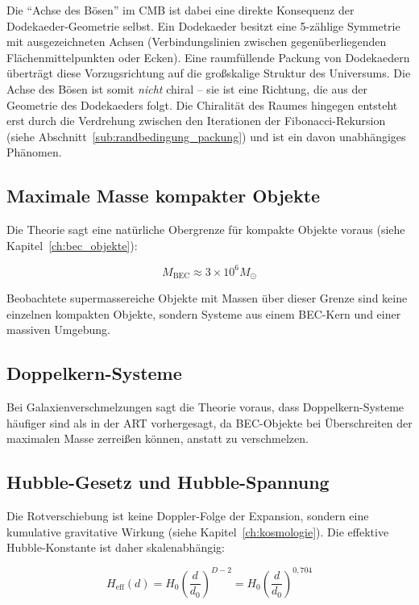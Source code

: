 Die \enquote{Achse des Bösen} im CMB ist dabei eine direkte Konsequenz der Dodekaeder-Geometrie selbst. Ein Dodekaeder besitzt eine 5-zählige Symmetrie mit ausgezeichneten Achsen (Verbindungslinien zwischen gegenüberliegenden Flächenmittelpunkten oder Ecken). Eine raumfüllende Packung von Dodekaedern überträgt diese Vorzugsrichtung auf die großskalige Struktur des Universums. Die Achse des Bösen ist somit \emph{nicht} chiral – sie ist eine Richtung, die aus der Geometrie des Dodekaeders folgt. Die Chiralität des Raumes hingegen entsteht erst durch die Verdrehung zwischen den Iterationen der Fibonacci-Rekursion (siehe Abschnitt~\ref{sub:randbedingung_packung}) und ist ein davon unabhängiges Phänomen.

\subsection{Maximale Masse kompakter Objekte}
\label{sub:vorh_max_masse}

Die Theorie sagt eine natürliche Obergrenze für kompakte Objekte voraus (siehe Kapitel~\ref{ch:bec_objekte}):

\[
M_{\text{BEC}} \approx 3 \times 10^6 M_{\odot}
\]

Beobachtete supermassereiche Objekte mit Massen über dieser Grenze sind keine einzelnen kompakten Objekte, sondern Systeme aus einem BEC-Kern und einer massiven Umgebung.

\subsection{Doppelkern-Systeme}
\label{sub:vorh_doppelkern}

Bei Galaxienverschmelzungen sagt die Theorie voraus, dass Doppelkern-Systeme häufiger sind als in der ART vorhergesagt, da BEC-Objekte bei Überschreiten der maximalen Masse zerreißen können, anstatt zu verschmelzen.

\subsection{Hubble-Gesetz und Hubble-Spannung}
\label{sub:vorh_hubble}

Die Rotverschiebung ist keine Doppler-Folge der Expansion, sondern eine kumulative gravitative Wirkung (siehe Kapitel~\ref{ch:kosmologie}). Die effektive Hubble-Konstante ist daher skalenabhängig:

\[
H_{\text{eff}}(d) = H_0 \left( \frac{d}{d_0} \right)^{D-2} = H_0 \left( \frac{d}{d_0} \right)^{0,704}
\]

